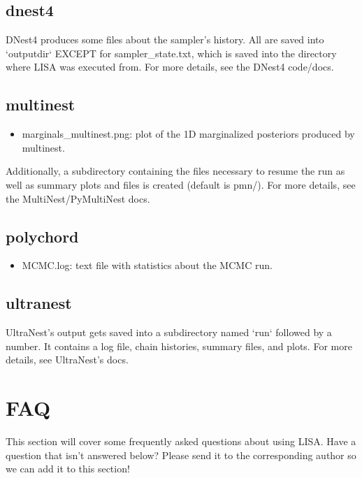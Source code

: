 \documentclass[letterpaper, 12pt]{article}
\begin{document}
\subsection{dnest4}
DNest4 produces some files about the sampler's history.  All are saved into 
`outputdir` EXCEPT for sampler\_state.txt, which is saved into the directory 
where LISA was executed from.  For more details, see the DNest4 code/docs.

\subsection{multinest}
\begin{itemize}
\item marginals\_multinest.png: plot of the 1D marginalized posteriors produced 
                               by multinest.
\end{itemize}
\noindent Additionally, a subdirectory containing the files necessary to resume 
the run as well as summary plots and files is created (default is pmn/).  For 
more details, see the MultiNest/PyMultiNest docs.

\subsection{polychord}
\begin{itemize}
\item MCMC.log: text file with statistics about the MCMC run.
\end{itemize}

\subsection{ultranest}
UltraNest's output gets saved into a subdirectory named `run` followed by a 
number.  It contains a log file, chain histories, summary files, and plots. 
For more details, see UltraNest's docs.


\section{FAQ}

This section will cover some frequently asked questions about using LISA.  
Have a question that isn't answered below?  Please send it to the corresponding 
author so we can add it to this section! \newline
\end{document}
